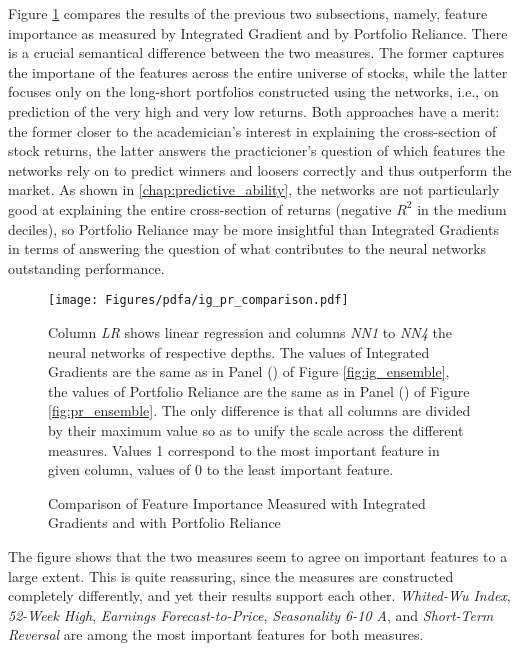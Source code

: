 	Figure \ref{fig:ig_pr_comparison} compares the results of the previous two subsections, namely, feature importance as measured by Integrated Gradient and by Portfolio Reliance. There is a crucial semantical difference between the two measures. The former captures the importane of the features across the entire universe of stocks, while the latter focuses only on the long-short portfolios constructed using the networks, i.e., on prediction of the very high and very low returns. Both approaches have a merit: the former closer to the academician's interest in explaining the cross-section of stock returns, the latter answers the practicioner's question of which features the networks rely on to predict winners and loosers correctly and thus outperform the market. As shown in \ref{chap:predictive_ability}, the networks are not particularly good at explaining the entire cross-section of returns (negative $R^2$ in the medium deciles), so Portfolio Reliance may be more insightful than Integrated Gradients in terms of answering the question of what contributes to the neural networks outstanding performance.
	
	\begin{figure}[!htb]
		\centering
		\texttt{[image: Figures/pdfa/ig\_pr\_comparison.pdf]}
		\caption{Comparison of Feature Importance Measured with Integrated Gradients and with Portfolio Reliance}
		\label{fig:ig_pr_comparison}
		\medskip
		\small 
		Column \textit{LR} shows linear regression and columns \textit{NN1} to \textit{NN4} the neural networks of respective depths. The values of Integrated Gradients are the same as in Panel () of Figure \ref{fig:ig_ensemble}, the values of Portfolio Reliance are the same as in Panel () of Figure \ref{fig:pr_ensemble}. The only difference is that all columns are divided by their maximum value so as to unify the scale across the different measures. Values 1 correspond to the most important feature in given column, values of 0 to the least important feature. 
	\end{figure}

	The figure shows that the two measures seem to agree on important features to a large extent. This is quite reassuring, since the measures are constructed completely differently, and yet their results support each other. \textit{Whited-Wu Index}, \textit{52-Week High}, \textit{Earnings Forecast-to-Price}, \textit{Seasonality 6-10 A}, and \textit{Short-Term Reversal} are among the most important features for both measures. 
	
